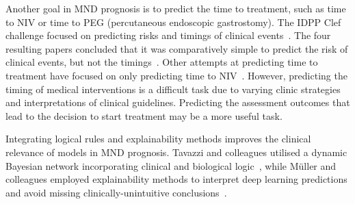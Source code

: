 Another goal in MND prognosis is to predict the time to treatment, such as time to NIV or time to PEG (percutaneous endoscopic gastrostomy).
The IDPP Clef challenge focused on predicting risks and timings of clinical events~\cite{guazzoOverviewIDPPCLEF2022}.
The four resulting papers concluded that it was comparatively simple to predict the risk of clinical events, but not the timings~\cite{brancoHierarchicalModellingALS2022, mannionPredictingRiskTime2022, trescatoBaselineMachineLearning2022, pancottiMultiEventSurvivalPrediction2022}.
Other attempts at predicting time to treatment have focused on only predicting time to NIV~\cite{carreiroPrognosticModelsBased2015, pereiraPredictingAssistedVentilation2019}.
However, predicting the timing of medical interventions is a difficult task due to varying clinic strategies and interpretations of clinical guidelines.
Predicting the assessment outcomes that lead to the decision to start treatment may be a more useful task.

Integrating logical rules and explainability methods improves the clinical relevance of models in MND prognosis.
Tavazzi and colleagues utilised a dynamic Bayesian network incorporating clinical and biological logic~\cite{tavazziPredictingFunctionalImpairment2022}, while Müller and colleagues employed explainability methods to interpret deep learning predictions and avoid missing clinically-unintuitive conclusions~\cite{mullerExplainableModelsDisease2021}.



